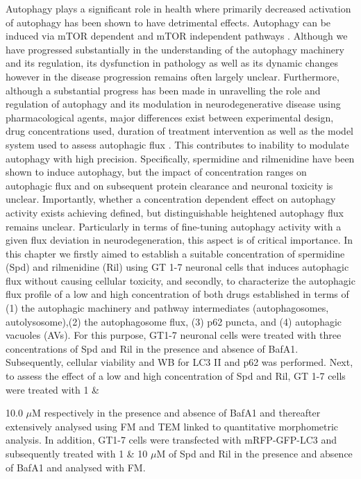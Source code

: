 Autophagy plays a significant role in health where primarily decreased activation of autophagy has been shown to have detrimental effects. Autophagy can be induced via mTOR dependent and mTOR independent pathways \citep{sarkar2013}. Although we have progressed substantially in the understanding of the autophagy machinery and its regulation, its dysfunction in pathology as well as its dynamic changes however in the disease progression remains often largely unclear. Furthermore, although a substantial progress has been made in unravelling the role and regulation of autophagy and its modulation in neurodegenerative disease using pharmacological agents, major differences exist between experimental design, drug concentrations used, duration of treatment intervention as well as the model system used to assess autophagic flux \citep{lumkwana2017}. This contributes to inability to modulate autophagy with high precision. Specifically, spermidine and rilmenidine have been shown to induce autophagy, but the impact of concentration ranges on autophagic flux and on subsequent protein clearance and neuronal toxicity is unclear. Importantly, whether a concentration dependent effect on autophagy activity exists achieving defined, but distinguishable heightened autophagy flux remains unclear. Particularly in terms of fine-tuning autophagy activity with a given flux deviation in neurodegeneration, this aspect is of critical importance. In this chapter we firstly aimed to establish a suitable concentration of spermidine (Spd) and rilmenidine (Ril) using GT 1-7 neuronal cells that induces autophagic flux without causing cellular toxicity, and secondly, to characterize the autophagic flux profile of a low and high concentration of both drugs established in terms of (1) the autophagic machinery and pathway intermediates (autophagosomes, autolysosome),(2) the autophagosome flux, (3) p62 puncta, and (4) autophagic vacuoles (AVs). For this purpose, GT1-7 neuronal cells were treated with three concentrations of Spd and Ril in the presence and absence of BafA1. Subsequently, cellular viability and WB for LC3 II and p62 was performed. Next, to assess the effect of a low and high concentration of Spd and Ril, GT 1-7 cells were treated with 1 \& {10.0 $\mu$M respectively in the presence and absence of BafA1 and thereafter extensively analysed using FM and TEM linked to quantitative morphometric analysis. In addition, GT1-7 cells were transfected with mRFP-GFP-LC3 \citep{yoshii2017} and subsequently treated with 1 \& 10 $\mu$M of Spd and Ril in the presence and absence of BafA1 and analysed with FM.
 
}
